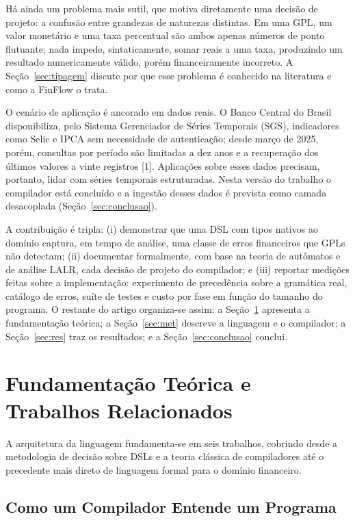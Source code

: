 \documentclass[conference]{IEEEtran}
\begin{document}
Há ainda um problema mais sutil, que motiva diretamente uma decisão de projeto: a confusão entre grandezas de naturezas distintas. Em uma GPL, um valor monetário e uma taxa percentual são ambos apenas números de ponto flutuante; nada impede, sintaticamente, somar reais a uma taxa, produzindo um resultado numericamente válido, porém financeiramente incorreto. A Seção~\ref{sec:tipagem} discute por que esse problema é conhecido na literatura e como a FinFlow o trata.

O cenário de aplicação é ancorado em dados reais. O Banco Central do Brasil disponibiliza, pelo Sistema Gerenciador de Séries Temporais (SGS), indicadores como Selic e IPCA sem necessidade de autenticação; desde março de 2025, porém, consultas por período são limitadas a dez anos e a recuperação dos últimos valores a vinte registros [1]. Aplicações sobre esses dados precisam, portanto, lidar com séries temporais estruturadas. Nesta versão do trabalho o compilador está concluído e a ingestão desses dados é prevista como camada desacoplada (Seção~\ref{sec:conclusao}).

A contribuição é tripla: (i) demonstrar que uma DSL com tipos nativos ao domínio captura, em tempo de análise, uma classe de erros financeiros que GPLs não detectam; (ii) documentar formalmente, com base na teoria de autômatos e de análise LALR, cada decisão de projeto do compilador; e (iii) reportar medições feitas sobre a implementação: experimento de precedência sobre a gramática real, catálogo de erros, suíte de testes e custo por fase em função do tamanho do programa. O restante do artigo organiza-se assim: a Seção~\ref{sec:fund} apresenta a fundamentação teórica; a Seção~\ref{sec:met} descreve a linguagem e o compilador; a Seção~\ref{sec:res} traz os resultados; e a Seção~\ref{sec:conclusao} conclui.

\section{Fundamentação Teórica e Trabalhos Relacionados}
\label{sec:fund}

A arquitetura da linguagem fundamenta-se em seis trabalhos, cobrindo desde a metodologia de decisão sobre DSLs e a teoria clássica de compiladores até o precedente mais direto de linguagem formal para o domínio financeiro.

\subsection{Como um Compilador Entende um Programa}
\label{sec:visao}
\end{document}
